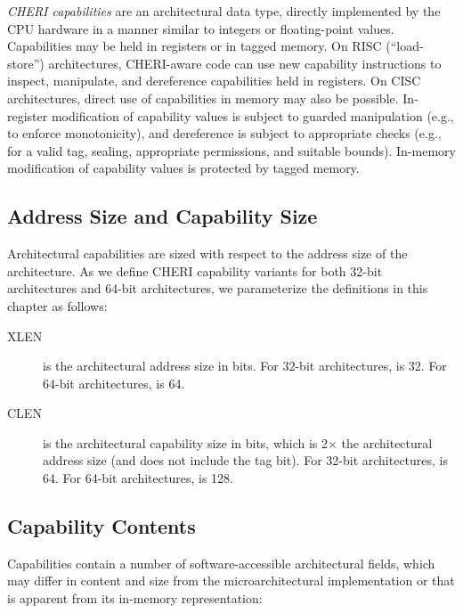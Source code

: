\textit{CHERI capabilities} are an architectural data type, directly
implemented by the CPU hardware in a manner similar to integers or
floating-point values.
Capabilities may be held in registers or in tagged memory.
On RISC (``load-store'') architectures, CHERI-aware code can use new
capability instructions to inspect, manipulate, and dereference capabilities
held in registers.
On CISC architectures, direct use of capabilities in memory may also be
possible.
In-register modification of capability values is subject to guarded
manipulation (e.g., to enforce monotonicity), and dereference is subject to
appropriate checks (e.g., for a valid tag, sealing, appropriate permissions,
and suitable bounds).
In-memory modification of capability values is protected by tagged memory.

\subsection{Address Size and Capability Size}

Architectural capabilities are sized with respect to the address size of the
architecture.
As we define CHERI capability variants for both 32-bit architectures and
64-bit architectures, we parameterize the definitions in this chapter as
follows:

\begin{description}
\item[XLEN] is the architectural address size in bits.
  For 32-bit architectures, \xlen{} is 32.
  For 64-bit architectures, \xlen{} is 64.

\item[CLEN] is the architectural capability size in bits, which is 2$\times$
  the architectural address size (and does not include the tag bit).
  For 32-bit architectures, \clen{} is 64.
  For 64-bit architectures, \clen{} is 128.
\end{description}

\subsection{Capability Contents}

Capabilities contain a number of software-accessible architectural fields,
which may differ in content and size from the microarchitectural
implementation or that is apparent from its in-memory representation:

